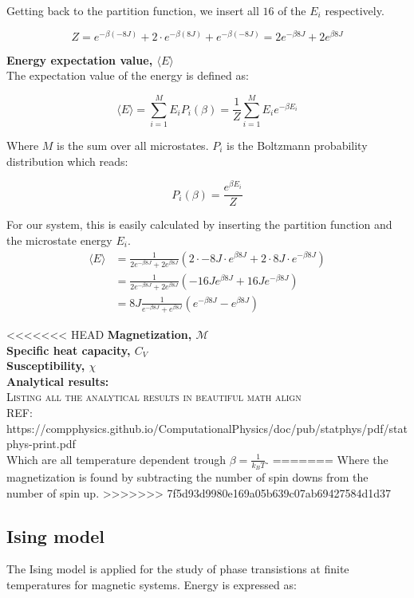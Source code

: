 \documentclass[../main.tex]{subfiles}
\begin{document}
    Getting back to the partition function, we insert all $16$ of the $E_i$ respectively.

    \[Z = e^{-\beta (-8J)} + 2 \cdot e^{-\beta (8J)} + e^{-\beta (-8J)} = 2e^{-\beta 8J} + 2e^{\beta 8J}\]

    \textbf{Energy expectation value, $\langle E \rangle$}\\
    The expectation value of the energy is defined as:

    \[\langle E \rangle = \sum_{i=1}^M E_i P_i(\beta) = \frac{1}{Z}\sum_{i=1}^M E_i e^{-\beta E_i}\]

    Where $M$ is the sum over all microstates. $P_i$ is the Boltzmann probability distribution which reads:

    \[P_i(\beta) = \frac{e^{\beta E_i}}{Z}\]

    For our system, this is easily calculated by inserting the partition function and the microstate energy $E_i$.
    \begin{align*}
      \langle E \rangle &= \frac{1}{2e^{-\beta 8J} + 2e^{\beta 8J}} \left(2 \cdot -8J \cdot e^{\beta 8J} + 2\cdot 8J \cdot e^{-\beta8J}\right)\\
        &= \frac{1}{2e^{-\beta 8J} + 2e^{\beta 8J}} \left(-16J e^{\beta8J} + 16Je^{-\beta 8J}\right)\\
        &= 8J \frac{1}{e^{-\beta 8J} + e^{\beta 8J}}  \left(e^{-\beta8J} - e^{\beta 8J}\right)
    \end{align*}

<<<<<<< HEAD
    \textbf{Magnetization, $\mathcal{M}$}\\
    \textbf{Specific heat capacity, $C_V$}\\
    \textbf{Susceptibility, $\chi$}\\

    \textbf{Analytical results:}\\
    \textsc{Listing all the analytical results in beautiful math align}\\
    REF: https://compphysics.github.io/ComputationalPhysics/doc/pub/statphys/pdf/statphys-print.pdf\\
    
    Which are all temperature dependent trough $\beta = \frac{1}{k_B T}$.
=======
    Where the magnetization is found by subtracting the number of spin downs from the number of spin up.
>>>>>>> 7f5d93d9980e169a05b639c07ab69427584d1d37


    \subsection{Ising model}
    The Ising model is applied for the study of phase transistions at finite temperatures
    for magnetic systems. Energy is expressed as:
\end{document}
